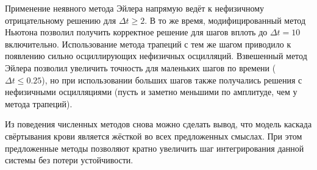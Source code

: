 Применение неявного метода Эйлера напрямую ведёт к нефизичному отрицательному решению для $ \Delta t \geqslant 2 $.
В то же время, модифицированный метод Ньютона позволил получить корректное решение для шагов вплоть до $ \Delta t = 10 $ включительно.
Использование метода трапеций с тем же шагом приводило к появлению сильно осциллирующих нефизичных осцилляций.
Взвешенный метод Эйлера позволил увеличить точность для маленьких шагов по времени ($ \Delta t \leqslant 0.25 $),
но при использовании больших шагов также получались решения с нефизичными осцилляциями
(пусть и заметно меньшими по амплитуде, чем у метода трапеций).

Из поведения численных методов снова можно сделать вывод,
что модель каскада свёртывания крови является жёсткой во всех предложенных смыслах.
При этом предложенные методы позволяют кратно увеличить шаг интегрирования данной системы без потери устойчивости.
